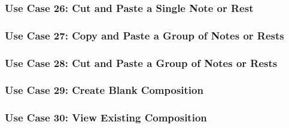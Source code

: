 
\subsubsection{Use Case 26: Cut and Paste a Single Note or Rest}


\subsubsection{Use Case 27: Copy and Paste a Group of Notes or Rests}


\subsubsection{Use Case 28: Cut and Paste a Group of Notes or Rests}


\subsubsection{Use Case 29: Create Blank Composition}


\subsubsection{Use Case 30: View Existing Composition}

